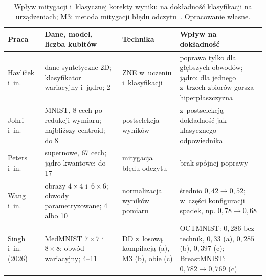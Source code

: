 \begin{table}[tb]
\centering
\caption[Wpływ mitygacji i~korekty wyniku na dokładność klasyfikacji na rzeczywistych urządzeniach]{Wpływ mitygacji i~klasycznej korekty wyniku na dokładność klasyfikacji na urządzeniach; M3: metoda mitygacji błędu odczytu~\cite{nation_scalable_2021}. Opracowanie własne.}
\label{tab:lr:cls:mitigation}
\footnotesize
\setlength{\tabcolsep}{3pt}
\newcommand{\lrc}[1]{\raggedright\hspace{0pt}#1}
\begin{tabular}{@{}p{2.5cm}p{4.3cm}p{2.8cm}p{5.7cm}@{}}
\toprule
\lrc{\textbf{Praca}} & \lrc{\textbf{Dane, model, liczba kubitów}} & \lrc{\textbf{Technika}} & \lrc{\textbf{Wpływ na dokładność}} \tabularnewline
\midrule
\lrc{Havlíček i~in.~\cite{havlicek_supervised_2019}} & \lrc{dane syntetyczne 2D; klasyfikator wariacyjny i~jądro; 2} & \lrc{ZNE w~uczeniu i~klasyfikacji} & \lrc{poprawa tylko dla głębszych obwodów; jądro: dla jednego z~trzech zbiorów gorsza hiperpłaszczyzna} \tabularnewline
\lrc{Johri i~in.~\cite{johri_nearest_2021}} & \lrc{MNIST, 8 cech po redukcji wymiaru; najbliższy centroid; do 8} & \lrc{postselekcja wyników} & \lrc{z~postselekcją dokładność jak klasycznego odpowiednika} \tabularnewline
\lrc{Peters i~in.~\cite{peters_machine_2021}} & \lrc{supernowe, 67 cech; jądro kwantowe; do 17} & \lrc{mitygacja błędu odczytu} & \lrc{brak spójnej poprawy} \tabularnewline
\lrc{Wang i~in.~\cite{wang_quantumnat_2022}} & \lrc{obrazy $4\times4$ i~$6\times6$; obwody parametryzowane; 4 albo 10} & \lrc{normalizacja wyników pomiaru} & \lrc{średnio $0{,}42\to0{,}52$; w~części konfiguracji spadek, np. $0{,}78\to0{,}68$} \tabularnewline
\lrc{Singh i~in. (2026)~\cite{singh_benchmarking_2026}} & \lrc{MedMNIST $7\times7$ i~$8\times8$; obwód wariacyjny; 4--11} & \lrc{DD z~losową kompilacją (a), M3 (b), obie (c)} & \lrc{OCTMNIST: $0{,}286$ bez technik, $0{,}33$ (a), $0{,}285$ (b), $0{,}397$ (c); BreastMNIST: $0{,}782\to0{,}769$ (c)} \tabularnewline
\bottomrule
\end{tabular}
\end{table}

